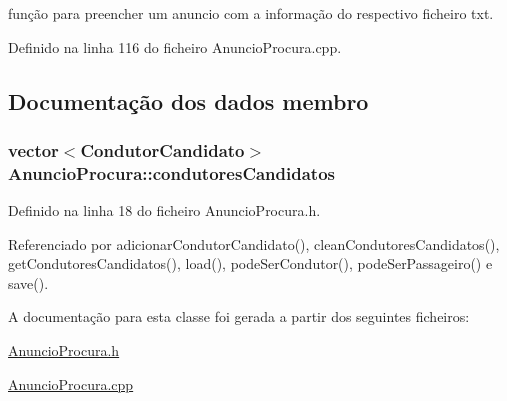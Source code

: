 função para preencher um anuncio com a informação do respectivo ficheiro txt. 



Definido na linha 116 do ficheiro Anuncio\+Procura.\+cpp.



\subsection{Documentação dos dados membro}
\hypertarget{class_anuncio_procura_a610f0c6542e76bb10e81850e5db7db8a}{
\subsubsection[{condutores\+Candidatos}]{\setlength{\rightskip}{0pt plus 5cm}vector$<${\bf Condutor\+Candidato}$>$ Anuncio\+Procura\+::condutores\+Candidatos\hspace{0.3cm}{\ttfamily [private]}}}\label{class_anuncio_procura_a610f0c6542e76bb10e81850e5db7db8a}


Definido na linha 18 do ficheiro Anuncio\+Procura.\+h.



Referenciado por adicionar\+Condutor\+Candidato(), clean\+Condutores\+Candidatos(), get\+Condutores\+Candidatos(), load(), pode\+Ser\+Condutor(), pode\+Ser\+Passageiro() e save().



A documentação para esta classe foi gerada a partir dos seguintes ficheiros\+:\begin{DoxyCompactItemize}
\item 
\hyperlink{_anuncio_procura_8h}{Anuncio\+Procura.\+h}\item 
\hyperlink{_anuncio_procura_8cpp}{Anuncio\+Procura.\+cpp}\end{DoxyCompactItemize}
